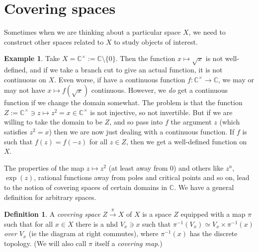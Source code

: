 \documentclass{tufte-handout}
\def\RR{\mathbb{R}}
\def\CC{\mathbb{C}}
\DeclareMathOperator{\pr}{pr}
\theoremstyle{definition}
\newtheorem{definition}{Definition}
\newtheorem{example}{Example}
\begin{document}
\section{Covering spaces}

Sometimes when we are thinking about a particular space $X$, we need to construct other spaces 
related to $X$ to study objects of interest.

\begin{example}
Take $X = \CC^\times :=\CC \setminus \{0\}$. Then the function $x\mapsto\sqrt{x}$ is
not well-defined, and if we take a branch cut to give an actual function, it is not continuous on $X$.
Even worse, if have a continuous function $f\colon \CC^\times \to \CC$, we may or may not have $x\mapsto f(\sqrt{x})$ continuous.
However, we \emph{do} get a continuous function if we change the domain somewhat. 
The problem is that the function $Z :=\CC^\times \ni z\mapsto z^2 = x \in \CC^\times$ is not injective, so not invertible.
But if we are willing to take the domain to be $Z$, and so pass into $f$ the argument $z$ (which satisfies $z^2 = x$)
then we are now just dealing with a continuous function.
If $f$ is such that $f(z) = f(-z)$ for all $z\in Z$, then we get a well-defined function on $X$.
\end{example}

The properties of the map $z\mapsto z^2$ (at least away from $0$) and others like $z^n$, $\exp(z)$, rational functions away from poles and critical points and so on, lead to the notion of 
covering spaces of certain domains in $\CC$. We have a general definition for arbitrary spaces.



\begin{definition}
A\marginnote{%
\[
\xymatrix{\pi^{-1}(V_x) \ar[r]^-\simeq \ar[d]_{\pi} & V_x \times \pi^{-1}(x)\ar[dl]^{\pr_1}\\V_x}
\]
}
\emph{covering space} $Z\xrightarrow{\pi} X$ of $X$ is a space $Z$ equipped with a map 
$\pi$ such that for all $x\in X$ there is a nhd $V_x \ni x$ such that $\pi^{-1}(V_x) 
\simeq V_x \times \pi^{-1}(x)$ \emph{over} $V_x$ (ie the diagram at right commutes), where 
$\pi^{-1}(x)$ has the discrete topology.
(We will also call $\pi$ itself a 
\emph{covering map}.)
\end{definition}
\end{document}
